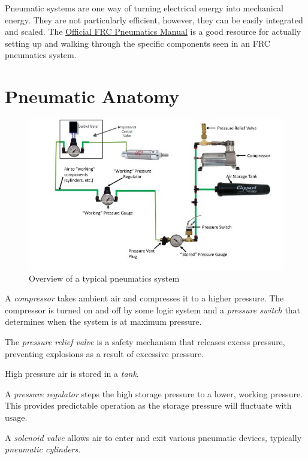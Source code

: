 Pneumatic systems are one way of turning electrical energy into mechanical energy. They are not particularly efficient, however, they can be easily integrated and scaled. The \href{http://www.team358.org/files/pneumatic/2017pneumatics-manual.pdf}{\color{red}\underline{Official FRC Pneumatics Manual}} is a good resource for actually setting up and walking through the specific components seen in an FRC pneumatics system.

\section{Pneumatic Anatomy}

\begin{figure}[H]
	\includegraphics[width=\textwidth]{imgs/pneumatics_overview.jpeg}
	\caption{Overview of a typical pneumatics system}
\end{figure}

\begin{asparaenum}[a)]
	\item A \textit{compressor} takes ambient air and compresses it to a higher pressure. The compressor is turned on and off by some logic system and a \textit{pressure switch} that determines when the system is at maximum pressure.
	\item The \textit{pressure relief valve} is a safety mechanism that releases excess pressure, preventing explosions as a result of excessive pressure.
	\item High pressure air is stored in a \textit{tank}.
	\item A \textit{pressure regulator} steps the high storage pressure to a lower, working pressure. This provides predictable operation as the storage pressure will fluctuate with usage.
	\item A \textit{solenoid valve} allows air to enter and exit various pneumatic devices, typically \textit{pneumatic cylinders}.
\end{asparaenum}

